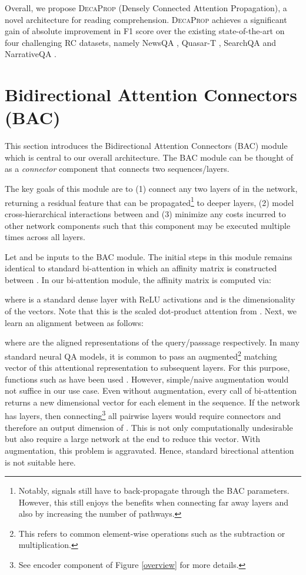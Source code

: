 \documentclass{article}
\begin{document}
Overall, we propose \textsc{DecaProp} (Densely Connected Attention Propagation), a novel architecture for reading comprehension. \textsc{DecaProp} achieves a significant gain of  absolute improvement in F1 score over the existing state-of-the-art on four challenging RC datasets, namely NewsQA \citep{trischler2016newsqa}, Quasar-T \citep{dhingra2017quasar}, SearchQA \citep{dunn2017searchqa} and NarrativeQA \citep{kovcisky2017narrativeqa}.

\section{Bidirectional Attention Connectors (BAC)}
This section introduces the Bidirectional Attention Connectors (BAC) module which is central to our overall architecture. The BAC module can be thought of as a \textit{connector} component that connects two sequences/layers.

The key goals of this module are to (1) connect any two layers of  in the network, returning a residual feature that can be propagated\footnote{Notably, signals still have to back-propagate through the BAC parameters. However, this still enjoys the benefits when connecting far away layers and also by increasing the number of pathways.} to deeper layers, (2) model cross-hierarchical interactions between  and (3) minimize any costs incurred to other network components such that this component may be executed multiple times across all layers.

Let  and  be inputs to the BAC module. The initial steps in this module remains identical to standard bi-attention in which an affinity matrix is constructed between . In our bi-attention module, the affinity matrix is computed via:

where  is a standard dense layer with ReLU activations and  is the dimensionality of the vectors. Note that this is the scaled dot-product attention from \cite{vaswani2017attention}. Next, we learn an alignment between  as follows:

where  are the aligned representations of the query/passsage respectively. In many standard neural QA models, it is common to pass an augmented\footnote{This refers to common element-wise operations such as the subtraction or multiplication.} matching vector of this attentional representation to subsequent layers. For this purpose, functions such as  have been used \citep{wang2016machine}. However, simple/naive augmentation would not suffice in our use case. Even without augmentation, every call of bi-attention returns a new  dimensional vector for each element in the sequence. If the network has  layers, then connecting\footnote{See encoder component of Figure \ref{overview} for more details.} all pairwise layers would require  connectors and therefore an output dimension of . This is not only computationally undesirable but also require a large network at the end to reduce this vector. With augmentation, this problem is aggravated. Hence, standard birectional attention is not suitable here.
\end{document}
